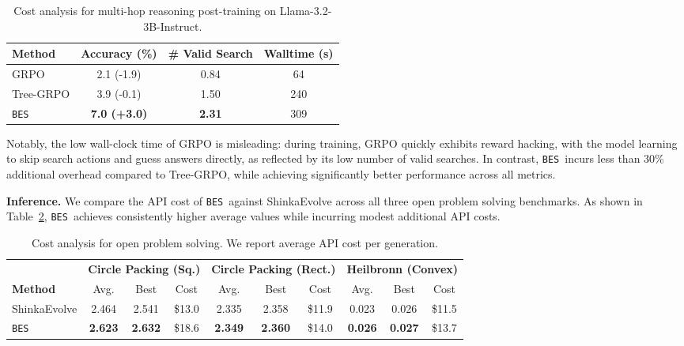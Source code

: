 \documentclass{llmxive}
\providecommand{\ours}{\texttt{BES}}
\providecommand{\arraystretch}{1.20}
\begin{document}
\begin{table}[!htbp]
\centering
\renewcommand{\arraystretch}{1.20}
\begin{tabular}{lccc}
\toprule
\textbf{Method} & \textbf{Accuracy (\%)} & \textbf{\# Valid Search} & \textbf{Walltime (s)} \\
\midrule
\rowcolor{cellbase} GRPO & 2.1 (-1.9) & 0.84 & 64 \\
\rowcolor{cellbase}  Tree-GRPO & 3.9 (-0.1) & 1.50 & 240 \\
\rowcolor{tabband} \ours & \textbf{7.0 (+3.0)} & \textbf{2.31} & 309 \\
\bottomrule
\end{tabular}
\label{tab:cost_posttraining}
\caption{Cost analysis for multi-hop reasoning post-training on Llama-3.2-3B-Instruct.}
\end{table}

Notably, the low wall-clock time of GRPO is misleading: during training, GRPO quickly exhibits reward hacking, with the model learning to skip search actions and guess answers directly, as reflected by its low number of valid searches. In contrast, \ours\ incurs less than 30\% additional overhead compared to Tree-GRPO, while achieving significantly better performance across all metrics.

\textbf{Inference.} We compare the API cost of \ours\ against ShinkaEvolve across all three open problem solving benchmarks. As shown in Table~\ref{tab:cost_inference}, \ours\ achieves consistently higher average values while incurring modest additional API costs.

\vspace{-0.5em}
\begin{table}[!htbp]
\centering
\renewcommand{\arraystretch}{1.15}
\begin{tabular}{lccccccccc}
\toprule
& \multicolumn{3}{c}{\textbf{Circle Packing (Sq.)}} & \multicolumn{3}{c}{\textbf{Circle Packing (Rect.)}} & \multicolumn{3}{c}{\textbf{Heilbronn (Convex)}} \\
\cmidrule(lr){2-4} \cmidrule(lr){5-7} \cmidrule(lr){8-10}
\textbf{Method} & Avg. & Best & Cost & Avg. & Best & Cost & Avg. & Best & Cost \\
\midrule
\rowcolor{cellbase} ShinkaEvolve & 2.464 & 2.541 & \$13.0 & 2.335 & 2.358 & \$11.9 & 0.023 & 0.026 & \$11.5 \\
\rowcolor{tabband} \ours & \textbf{2.623} & \textbf{2.632} & \$18.6 & \textbf{2.349} & \textbf{2.360} & \$14.0 & \textbf{0.026} & \textbf{0.027} & \$13.7 \\
\bottomrule
\end{tabular}
\label{tab:cost_inference}
\caption{Cost analysis for open problem solving. We report average API cost per generation.}
\end{table}
\vspace{-1em}
\end{document}
